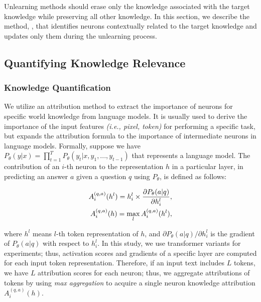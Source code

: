Unlearning methods should erase only the knowledge associated with the target knowledge while preserving all other knowledge.
In this section, we describe the method, \ourmodel, that identifies neurons contextually related to the target knowledge and updates only them during the unlearning process.



\subsection{Quantifying Knowledge Relevance}



\subsubsection{Knowledge Quantification} We utilize an attribution method \citep{shrikumar2016not} to extract the importance of neurons for specific world knowledge from language models.
It is usually used to derive the importance of the input features \textit{(i.e., pixel, token)} for performing a specific task, but \citet{yang2023task} expands the attribution formula to the importance of intermediate neurons in language models.
Formally, suppose we have $P_{\theta}(y|x) = \prod_{t=1}^{T} P_{\theta}(y_{t}|x,y_{1},...,y_{t-1})$ that represents a language model.
The contribution of an $i$-th neuron to the representation $h$ in a particular layer, in predicting an answer $a$ given a question $q$ using $P_{\theta}$, is defined as follows:



\vspace{-0.2cm}
\begin{equation}
\begin{aligned}
    \text{\normalsize $A^{(q,a)}_{i}(h^{l})=h^{l}_{i}\times \frac{\partial P_{\theta}(a|q)}{\partial h^{l}_{i}},$}
     \\
    \text{\normalsize $A^{(q,a)}_{i}(h) = \max_{l} A^{(q,a)}_{i}(h^{l}),$}\\
\end{aligned}
\label{eq:attr_lm}
\end{equation}
\vspace{-0.2cm}

\noindent where $h^{l}$ means $l$-th token representation of $h$, and $\partial P_{\theta}(a|q)/\partial h^{l}_{i}$ is the gradient of $P_{\theta}(a|q)$ with respect to $h^{l}_{i}$.
In this study, we use transformer variants for experiments; thus, activation scores and gradients of a specific layer are computed for each input token representation.
Therefore, if an input text includes $L$ tokens, we have $L$ attribution scores for each neuron; thus, we aggregate attributions of tokens by using \textit{max aggregation} to acquire a single neuron knowledge attribution $A^{(q,a)}_{i}(h)$.


